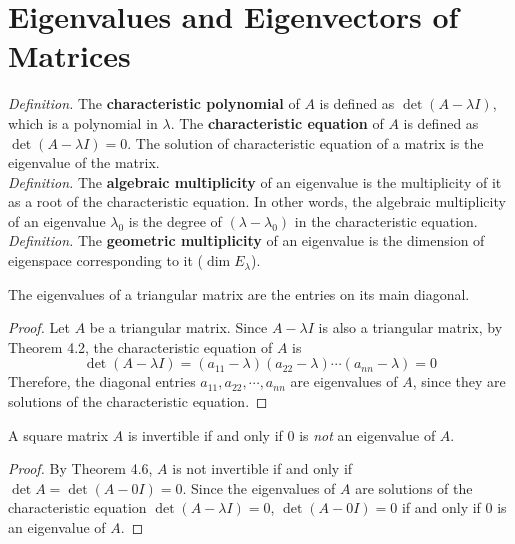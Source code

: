 \section{Eigenvalues and Eigenvectors of \nbyn Matrices}
\setcounter{theorem}{14}

\textit{Definition.} The \textbf{characteristic polynomial} of $A$ is defined as $\det{(A-\lambda I)}$, which is a polynomial in $\lambda$. The \textbf{characteristic equation} of $A$ is defined as $\det{(A - \lambda I)} = 0$. The solution of characteristic equation of a matrix is the eigenvalue of the matrix. \\

\textit{Definition.} The \textbf{algebraic multiplicity} of an eigenvalue is the multiplicity of it as a root of the characteristic equation. In other words, the algebraic multiplicity of an eigenvalue $\lambda_0$ is the degree of $(\lambda - \lambda_0)$ in the characteristic equation. \\

\textit{Definition.} The \textbf{geometric multiplicity} of an eigenvalue is the dimension of eigenspace corresponding to it ($\dim{E_\lambda}$).

\begin{theorem}
	The eigenvalues of a triangular matrix are the entries on its main diagonal.
\end{theorem}
\begin{proof}
	Let $A$ be a \nbyn triangular matrix. Since $A-\lambda I$ is also a triangular matrix, by Theorem 4.2, the characteristic equation of $A$ is \begin{equation*}
		\det{(A - \lambda I)} = (a_{11} - \lambda)(a_{22} - \lambda)\cdots(a_{nn} - \lambda) = 0
	\end{equation*}
	Therefore, the diagonal entries $a_{11}, a_{22}, \cdots, a_{nn}$ are eigenvalues of $A$, since they are solutions of the characteristic equation.
\end{proof}

\begin{theorem}
	A square matrix $ A $ is invertible if and only if 0 is \textit{not} an eigenvalue of $ A $.
\end{theorem}
\begin{proof}
	By Theorem 4.6, $A$ is not invertible if and only if $\det{A} = \det{(A - 0I)} = 0$. Since the eigenvalues of $A$ are solutions of the characteristic equation $\det{(A - \lambda I)} = 0$, $\det{(A - 0I)} = 0$ if and only if 0 is an eigenvalue of $A$.
\end{proof}

